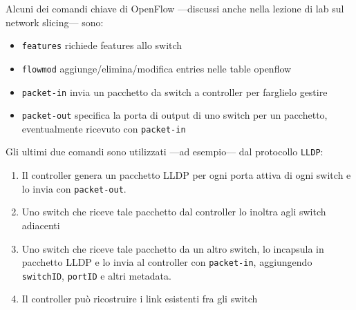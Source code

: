 
{\ns
Alcuni dei comandi chiave di OpenFlow ---discussi anche nella lezione di lab sul network slicing--- sono:
\begin{itemize}
    \item \texttt{features} richiede features allo switch
    \item \texttt{flowmod} aggiunge/elimina/modifica entries nelle table openflow 
    \item \texttt{packet-in} invia un pacchetto da switch a controller per farglielo gestire
    \item \texttt{packet-out} specifica la porta di output di uno switch per un pacchetto, eventualmente ricevuto con \texttt{packet-in}
\end{itemize}

Gli ultimi due comandi sono utilizzati ---ad esempio--- dal protocollo \texttt{LLDP}:
\begin{enumerate}
    \item Il controller genera un pacchetto LLDP per ogni porta attiva di ogni switch e lo invia con \texttt{packet-out}.
    \item Uno switch che riceve tale pacchetto dal controller lo inoltra agli switch adiacenti
    \item Uno switch che riceve tale pacchetto da un altro switch, lo incapsula in pacchetto LLDP e lo invia al controller con \texttt{packet-in}, aggiungendo \texttt{switchID}, \texttt{portID} e altri metadata.
    \item Il controller può ricostruire i link esistenti fra gli switch
\end{enumerate}
}

